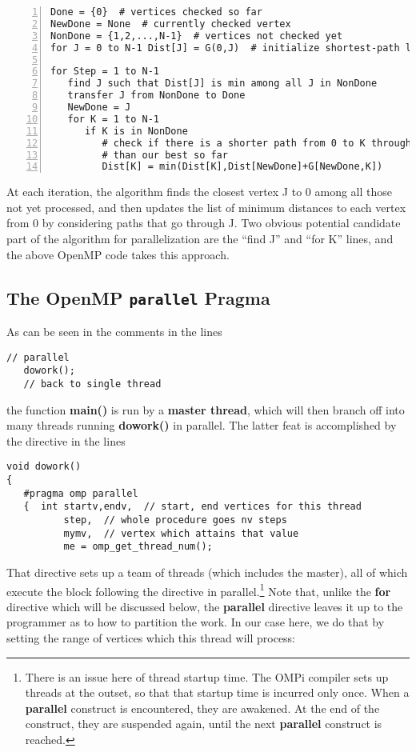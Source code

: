 \begin{Verbatim}[fontsize=\relsize{-2},numbers=left]
Done = {0}  # vertices checked so far
NewDone = None  # currently checked vertex
NonDone = {1,2,...,N-1}  # vertices not checked yet
for J = 0 to N-1 Dist[J] = G(0,J)  # initialize shortest-path lengths

for Step = 1 to N-1
   find J such that Dist[J] is min among all J in NonDone
   transfer J from NonDone to Done
   NewDone = J
   for K = 1 to N-1
      if K is in NonDone
         # check if there is a shorter path from 0 to K through NewDone
         # than our best so far
         Dist[K] = min(Dist[K],Dist[NewDone]+G[NewDone,K])
\end{Verbatim}

At each iteration, the algorithm finds the closest vertex J to 0 among all
those not yet processed, and then updates the list of minimum distances
to each vertex from 0 by considering paths that go through J.  Two
obvious potential candidate part of the algorithm for parallelization
are the ``find J'' and ``for K'' lines, and the above OpenMP code takes
this approach.

\subsection{The OpenMP {\tt parallel} Pragma}

As can be seen in the comments in the lines

\begin{Verbatim}[fontsize=\relsize{-2}]
   // parallel
   dowork();
   // back to single thread
\end{Verbatim}

the function {\bf main()} is run by a {\bf master thread}, which will
then branch off into many threads running {\bf dowork()} in parallel.
The latter feat is accomplished by the directive in the lines

\begin{Verbatim}[fontsize=\relsize{-2}]
void dowork()
{
   #pragma omp parallel
   {  int startv,endv,  // start, end vertices for this thread
          step,  // whole procedure goes nv steps
          mymv,  // vertex which attains that value
          me = omp_get_thread_num();
\end{Verbatim}

That directive sets up a team of threads (which includes the master),
all of which execute the block following the directive in
parallel.\footnote{There is an issue here of thread startup time.  The
OMPi compiler sets up threads at the outset, so that that startup time
is incurred only once.  When a {\bf parallel} construct is encountered,
they are awakened.  At the end of the construct, they are suspended
again, until the next {\bf parallel} construct is reached.} Note that,
unlike the {\bf for} directive which will be discussed below, the {\bf
parallel} directive leaves it up to the programmer as to how to
partition the work.  In our case here, we do that by setting the range
of vertices which this thread will process:

